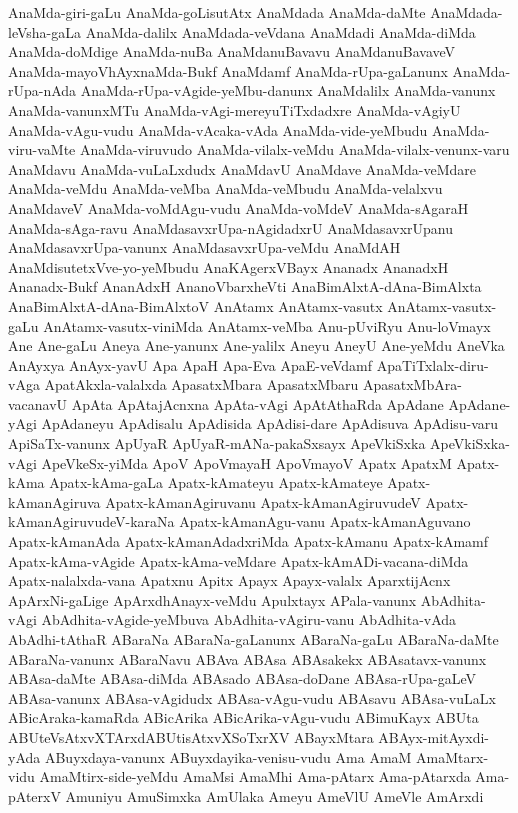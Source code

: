 {AnaMda-giri-gaLu
AnaMda-goLisutAtx
AnaMdada
AnaMda-daMte
AnaMdada-leVsha-gaLa
AnaMda-dalilx
AnaMdada-veVdana
AnaMdadi
AnaMda-diMda
AnaMda-doMdige
AnaMda-nuBa
AnaMdanuBavavu
AnaMdanuBavaveV
AnaMda-mayoVhAyxnaMda-Bukf
AnaMdamf
AnaMda-rUpa-gaLanunx
AnaMda-rUpa-nAda
AnaMda-rUpa-vAgide-yeMbu-danunx
AnaMdalilx
AnaMda-vanunx
AnaMda-vanunxMTu
AnaMda-vAgi-mereyuTiTxdadxre
AnaMda-vAgiyU
AnaMda-vAgu-vudu
AnaMda-vAcaka-vAda
AnaMda-vide-yeMbudu
AnaMda-viru-vaMte
AnaMda-viruvudo
AnaMda-vilalx-veMdu
AnaMda-vilalx-venunx-varu
AnaMdavu
AnaMda-vuLaLxdudx
AnaMdavU
AnaMdave
AnaMda-veMdare
AnaMda-veMdu
AnaMda-veMba
AnaMda-veMbudu
AnaMda-velalxvu
AnaMdaveV
AnaMda-voMdAgu-vudu
AnaMda-voMdeV
AnaMda-sAgaraH
AnaMda-sAga-ravu
AnaMdasavxrUpa-nAgidadxrU
AnaMdasavxrUpanu
AnaMdasavxrUpa-vanunx
AnaMdasavxrUpa-veMdu
AnaMdAH
AnaMdisutetxVve-yo-yeMbudu
AnaKAgerxVBayx
Ananadx
AnanadxH
Ananadx-Bukf
AnanAdxH
AnanoVbarxheVti
AnaBimAlxtA-dAna-BimAlxta
AnaBimAlxtA-dAna-BimAlxtoV
AnAtamx
AnAtamx-vasutx
AnAtamx-vasutx-gaLu
AnAtamx-vasutx-viniMda
AnAtamx-veMba
Anu-pUviRyu
Anu-loVmayx
Ane
Ane-gaLu
Aneya
Ane-yanunx
Ane-yalilx
Aneyu
AneyU
Ane-yeMdu
AneVka
AnAyxya
AnAyx-yavU
Apa
ApaH
Apa-Eva
ApaE-veVdamf
ApaTiTxlalx-diru-vAga
ApatAkxla-valalxda
ApasatxMbara
ApasatxMbaru
ApasatxMbAra-vacanavU
ApAta
ApAtajAcnxna
ApAta-vAgi
ApAtAthaRda
ApAdane
ApAdane-yAgi
ApAdaneyu
ApAdisalu
ApAdisida
ApAdisi-dare
ApAdisuva
ApAdisu-varu
ApiSaTx-vanunx
ApUyaR
ApUyaR-mANa-pakaSxsayx
ApeVkiSxka
ApeVkiSxka-vAgi
ApeVkeSx-yiMda
ApoV
ApoVmayaH
ApoVmayoV
Apatx
ApatxM
Apatx-kAma
Apatx-kAma-gaLa
Apatx-kAmateyu
Apatx-kAmateye
Apatx-kAmanAgiruva
Apatx-kAmanAgiruvanu
Apatx-kAmanAgiruvudeV
Apatx-kAmanAgiruvudeV-karaNa
Apatx-kAmanAgu-vanu
Apatx-kAmanAguvano
Apatx-kAmanAda
Apatx-kAmanAdadxriMda
Apatx-kAmanu
Apatx-kAmamf
Apatx-kAma-vAgide
Apatx-kAma-veMdare
Apatx-kAmADi-vacana-diMda
Apatx-nalalxda-vana
Apatxnu
Apitx
Apayx
Apayx-valalx
AparxtijAcnx
ApArxNi-gaLige
ApArxdhAnayx-veMdu
Apulxtayx
APala-vanunx
AbAdhita-vAgi
AbAdhita-vAgide-yeMbuva
AbAdhita-vAgiru-vanu
AbAdhita-vAda
AbAdhi-tAthaR
ABaraNa
ABaraNa-gaLanunx
ABaraNa-gaLu
ABaraNa-daMte
ABaraNa-vanunx
ABaraNavu
ABAva
ABAsa
ABAsakekx
ABAsatavx-vanunx
ABAsa-daMte
ABAsa-diMda
ABAsado
ABAsa-doDane
ABAsa-rUpa-gaLeV
ABAsa-vanunx
ABAsa-vAgidudx
ABAsa-vAgu-vudu
ABAsavu
ABAsa-vuLaLx
ABicAraka-kamaRda
ABicArika
ABicArika-vAgu-vudu
ABimuKayx
ABUta
ABUteVsAtxvXTArxdABUtisAtxvXSoTxrXV
ABayxMtara
ABAyx-mitAyxdi-yAda
ABuyxdaya-vanunx
ABuyxdayika-venisu-vudu
Ama
AmaM
AmaMtarx-vidu
AmaMtirx-side-yeMdu
AmaMsi
AmaMhi
Ama-pAtarx
Ama-pAtarxda
Ama-pAterxV
Amuniyu
AmuSimxka
AmUlaka
Ameyu
AmeVlU
AmeVle
AmArxdi
}
